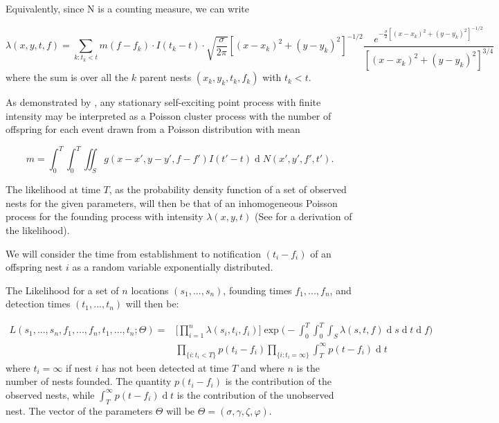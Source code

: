 \documentclass[11pt,a4paper]{article}
\renewcommand{\d}[1]{\ensuremath{\operatorname{d}\!{#1}}}
\begin{document}
{\color{red} Equivalently, since N is a counting measure, we can write

\[
\lambda(x, y, t, f) = \sum_{ k: t_k < t } m(f - f_k) \cdot I(t_k - t)\cdot \sqrt{\frac{\sigma}{2 \pi}} [{(x - x_k)^{2} + (y - y_k)^{2}}]^{-1/2} \frac{e^{- \frac{\sigma}{2} [(x - x_k)^{2} + (y - y_k)^{2}]^{-1/2}}}{[(x - x_k)^{2} + (y - y_k)^{2}]^{3/4}}
\]
where the sum is over all the $k$ parent nests $(x_k, y_k, t_k, f_k)$ with $t_k < t$.

As demonstrated by \cite{Hawkes74}, any stationary self-exciting point process with finite intensity may be interpreted as a Poisson cluster process with the number of offspring for each event drawn from a Poisson distribution with mean 

\begin{equation} \label{eq:NumOffsp}
    m = \int_0^T \int_0^T \iint_S g(x-x', y-y', f-f') I(t' - t) \d N(x', y', f', t').
\end{equation}}

The likelihood at time $T$, {\color{red}as the probability density function of a set of observed nests for the given parameters,} will then be that of an inhomogeneous Poisson process for the founding process with intensity $\lambda(x, y, t)$ {\color{red} (See \cite{Reinhart} for a derivation of the likelihood).}

We will consider the time from establishment to notification $(t_i - f_i)$ of an offspring nest $i$ as a random variable exponentially distributed.

The Likelihood for a set of $n$ locations $(s_{1}, ... , s_{n})$, founding times $f_{1}, ... , f_{n}$, and detection times $(t_{1},  ... , t_{n})$ will then be:

\begin{equation*}
\begin{aligned}
L(s_{1}, ..., s_{n}, f_{1}, ..., f_{n}, t_{1}, ..., t_{n} ; \Theta) = & \Bigg[ \prod_{i = 1}^{n} \lambda(s_{i}, t_{i}, f_{i}) \Bigg] \exp \Bigg(- \int_{0}^{T} \int_{0}^{T} \int_{S} \lambda(s, t, f) \d s \d t \d f \Bigg) \\ 
& \prod_{\{ i : t_{i} < T \} } p(t_{i} - f_{i}) \prod_{ \{ i : t_{i} = \infty \} } \int_{T}^{\infty} p(t - f_{i}) \d t
\end{aligned}
\end{equation*}
where $t_{i} = \infty$ if nest $i$ has not been detected at time $T$ and where $n$ is the number of nests founded. The quantity $p(t_{i} - f_{i})$ is the contribution of the observed nests, while $\int_{T}^{\infty} p(t - f_{i}) \d t$ is the contribution of the unobserved nest. The vector of the parameters $\Theta$ will be $\Theta = ( \sigma, \gamma, \zeta, \varphi)$.
\end{document}
